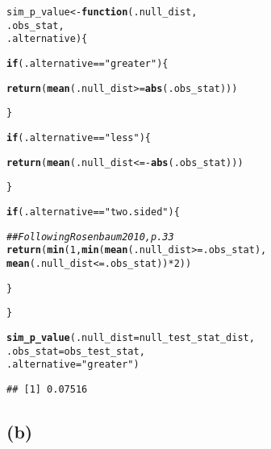 \documentclass[11pt]{article}\usepackage[]{graphicx}\usepackage[]{color}
\makeatletter
\newcommand{\hlnum}[1]{\textcolor[rgb]{0.686,0.059,0.569}{#1}}%
\newcommand{\hlstr}[1]{\textcolor[rgb]{0.192,0.494,0.8}{#1}}%
\newcommand{\hlcom}[1]{\textcolor[rgb]{0.678,0.584,0.686}{\textit{#1}}}%
\newcommand{\hlopt}[1]{\textcolor[rgb]{0,0,0}{#1}}%
\newcommand{\hlstd}[1]{\textcolor[rgb]{0.345,0.345,0.345}{#1}}%
\newcommand{\hlkwa}[1]{\textcolor[rgb]{0.161,0.373,0.58}{\textbf{#1}}}%
\newcommand{\hlkwb}[1]{\textcolor[rgb]{0.69,0.353,0.396}{#1}}%
\newcommand{\hlkwc}[1]{\textcolor[rgb]{0.333,0.667,0.333}{#1}}%
\newcommand{\hlkwd}[1]{\textcolor[rgb]{0.737,0.353,0.396}{\textbf{#1}}}%
\newenvironment{kframe}{%
 \def\at@end@of@kframe{}%
 \ifinner\ifhmode%
  \def\at@end@of@kframe{\end{minipage}}%
  \begin{minipage}{\columnwidth}%
 \fi\fi%
 \def\FrameCommand##1{\hskip\@totalleftmargin \hskip-\fboxsep
 \colorbox{shadecolor}{##1}\hskip-\fboxsep
     \hskip-\linewidth \hskip-\@totalleftmargin \hskip\columnwidth}%
 \MakeFramed {\advance\hsize-\width
   \@totalleftmargin\z@ \linewidth\hsize
   \@setminipage}}%
 {\par\unskip\endMakeFramed%
 \at@end@of@kframe}
\newenvironment{knitrout}{}{} %
\theoremstyle{newstyle}
\makeatother
\begin{document}
\begin{knitrout}
\color{fgcolor}\begin{kframe}
\begin{alltt}
\hlstd{sim_p_value} \hlkwb{<-} \hlkwa{function}\hlstd{(}\hlkwc{.null_dist}\hlstd{,}
                        \hlkwc{.obs_stat}\hlstd{,}
                        \hlkwc{.alternative}\hlstd{)\{}

  \hlkwa{if}\hlstd{(.alternative} \hlopt{==} \hlstr{"greater"}\hlstd{) \{}

    \hlkwd{return}\hlstd{(}\hlkwd{mean}\hlstd{(.null_dist} \hlopt{>=} \hlkwd{abs}\hlstd{(.obs_stat)))}

  \hlstd{\}}

  \hlkwa{if}\hlstd{(.alternative} \hlopt{==} \hlstr{"less"}\hlstd{) \{}


    \hlkwd{return}\hlstd{(}\hlkwd{mean}\hlstd{(.null_dist} \hlopt{<= -}\hlkwd{abs}\hlstd{(.obs_stat)))}

  \hlstd{\}}

  \hlkwa{if}\hlstd{(.alternative} \hlopt{==} \hlstr{"two.sided"}\hlstd{)\{}

    \hlcom{## Following Rosenbaum 2010, p. 33}
    \hlkwd{return}\hlstd{(}\hlkwd{min}\hlstd{(}\hlnum{1}\hlstd{,} \hlkwd{min}\hlstd{(}\hlkwd{mean}\hlstd{(.null_dist} \hlopt{>=} \hlstd{.obs_stat),}
               \hlkwd{mean}\hlstd{(.null_dist} \hlopt{<=} \hlstd{.obs_stat))} \hlopt{*} \hlnum{2}\hlstd{))}

  \hlstd{\}}

\hlstd{\}}

\hlkwd{sim_p_value}\hlstd{(}\hlkwc{.null_dist} \hlstd{= null_test_stat_dist,}
            \hlkwc{.obs_stat} \hlstd{= obs_test_stat,}
            \hlkwc{.alternative} \hlstd{=} \hlstr{"greater"}\hlstd{)}
\end{alltt}
\begin{verbatim}
## [1] 0.07516
\end{verbatim}
\end{kframe}
\end{knitrout}

\subsection{(b)}
\end{document}
